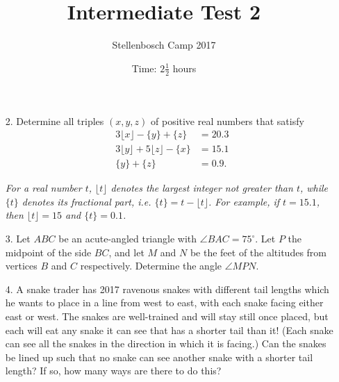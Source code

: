\documentclass{article}
\title{Intermediate Test 2}
\author{Stellenbosch Camp 2017}
\date{Time: $2\frac{1}{2}$ hours}
\begin{document}
 \maketitle

\begin{enumerate}

\item[2.] %
Determine all triples $(x,y,z)$ of positive real numbers that satisfy
\begin{align*}
	3\lfloor{x}\rfloor -\{y\} +\{z\} &= 20.3 \\
	3\lfloor{y}\rfloor +5\lfloor{z}\rfloor -\{x\} &= 15.1 \\
	\{y\} +\{z\} &= 0.9.
\end{align*}

\emph{For a real number $t$, $\lfloor{t}\rfloor$ denotes the largest integer not greater than $t$, while $\{t\}$ denotes its fractional part, i.e. $\{t\} = t -\lfloor{t}\rfloor$. For example, if $t = 15.1$, then $\lfloor{t}\rfloor = 15$ and $\{t\} = 0.1$.}

\item[3.] %
Let $ABC$ be an acute-angled triangle with $\angle BAC = 75^\circ$. Let $P$ the midpoint of the side $BC$, and let $M$ and $N$ be the feet of the altitudes from vertices $B$ and $C$ respectively. Determine the angle $\angle MPN$.

\item[4.] %
A snake trader has 2017 ravenous snakes with different tail lengths which he wants to place in a line from west to east, with each snake facing either east or west. The snakes are well-trained and will stay still once placed, but each will eat any snake it can see that has a shorter tail than it! (Each snake can see all the snakes in the direction in which it is facing.) Can the snakes be lined up such that no snake can see another snake with a shorter tail length? If so, how many ways are there to do this?

\end{enumerate}
\end{document}
